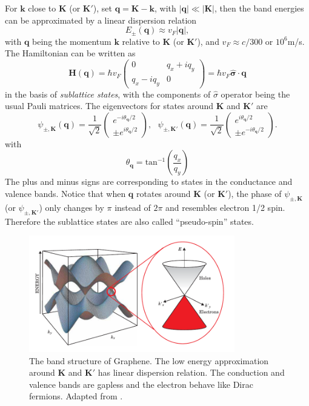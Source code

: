 \documentclass[pdflatex, sectionletters, 12pt]{pittetd}    %
\begin{document}
For $\mathbf{k}$ close to $\mathbf{K}$ (or $\mathbf{K'}$), set $\mathbf{q} = \mathbf{K} - \mathbf{k}$, with $|\mathbf{q}| \ll |\mathbf{K}|$, then the band energies can be approximated by a linear dispersion relation
$$E_{\pm}(\mathbf{q}) \approx v_F|\mathbf{q}|,$$
with $\mathbf{q}$ being the momentum $\mathbf{k}$ relative to $\mathbf{K}$ (or $\mathbf{K'}$), and $v_F \approx c/300$ or $10^6$m/s. The Hamiltonian can be written as 
\begin{equation}
\mathbf{H}(\mathbf{q}) = 
\hbar v_F 
\begin{pmatrix}
0 & q_x + iq_y \\
q_x - iq_y & 0
\end{pmatrix}
=
\hbar v_F \hat{\mathbf{\sigma}} \cdot \mathbf{q}
\label{EQN:DiracHamiltonian}
\end{equation}
in the basis of \emph{sublattice states}, with the components of $\hat{\sigma}$ operator being the usual Pauli matrices. The eigenvectors for states around $\mathbf{K}$ and $\mathbf{K'}$ are
\begin{equation}
\psi_{\pm, \mathbf{K}}(\mathbf{q}) = \frac{1}{\sqrt{2}} 
\begin{pmatrix}
e^{-i\theta_{\mathbf{q}}/2} \\
\pm e^{i\theta_{\mathbf{q}}/2}
\end{pmatrix}, \ \ \
\psi_{\pm, \mathbf{K'}}(\mathbf{q}) = \frac{1}{\sqrt{2}} 
\begin{pmatrix}
e^{i\theta_{\mathbf{q}}/2} \\
\pm e^{-i\theta_{\mathbf{q}}/2}
\end{pmatrix}.
\label{EQN:Eigenstates}
\end{equation}
with 
$$\theta_\mathbf{q} = \mathrm{tan}^{-1}\left(\frac{q_x}{q_y}\right)$$
The plus and minus signs are corresponding to states in the conductance and valence bands. Notice that when $\mathbf{q}$ rotates around $\mathbf{K}$ (or $\mathbf{K'}$), the phase of $\psi_{\pm, \mathbf{K}}$ (or $\psi_{\pm, \mathbf{K'}}$) only changes by $\pi$ instead of $2\pi$ and resembles electron 1/2 spin. Therefore the sublattice states are also called ``pseudo-spin'' states\cite{neto2009electronic}. 

\begin{figure}[h!]
	\centering
	\includegraphics[width=0.8\textwidth]{Drawing/GrapheneBand.pdf}
	\caption{The band structure of Graphene. The low energy approximation around $\mathbf{K}$ and $\mathbf{K'}$ has linear dispersion relation. The conduction and valence bands are gapless and the electron behave like Dirac fermions. Adapted from \cite{wilson2006electrons}.}
	\label{FIG:GrapheneBand}
\end{figure}
\end{document}
